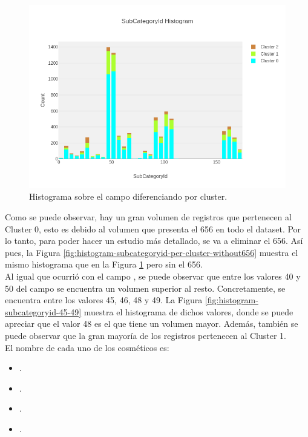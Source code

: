 \begin{figure}[!th]
\includegraphics[scale=0.5]{figures/histogram-subcategoryid-per-cluster}
\centering
\caption{Histograma sobre el campo  diferenciando por cluster.}
\label{fig:histogram-subcategoryid-per-cluster}
\end{figure}

Como se puede observar, hay un gran volumen de registros que pertenecen al Cluster 0, esto es debido al volumen que presenta el  656 en todo el dataset. Por lo tanto, para poder hacer un estudio más detallado, se va a eliminar el  656. Así pues, la Figura \ref{fig:histogram-subcategoryid-per-cluster-without656} muestra el mismo histograma que en la Figura \ref{fig:histogram-subcategoryid-per-cluster} pero sin el  656. \\

Al igual que ocurrió con el campo , se puede observar que entre los valores 40 y 50 del campo  se encuentra un volumen superior al resto. Concretamente, se encuentra entre los valores 45, 46, 48 y 49. La Figura \ref{fig:histogram-subcategoryid-45-49} muestra el histograma de dichos valores, donde se puede apreciar que el valor  48 es el que tiene un volumen mayor. Además, también se puede observar que la gran mayoría de los registros pertenecen al Cluster 1. \\

El nombre de cada uno de los cosméticos es:

\begin{itemize}
 \item {}.
 \item {}.
 \item {}.
 \item {}.
\end{itemize}


